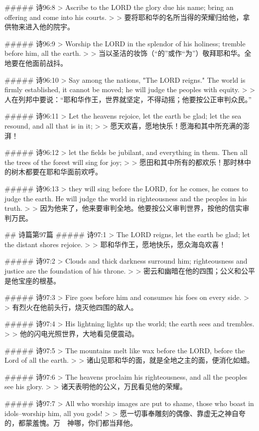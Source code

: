 ##### 诗96:8
> Ascribe to the LORD the glory due his name; bring an offering and come into his courts.
>
> 要将耶和华的名所当得的荣耀归给他，拿供物来进入他的院宇。


##### 诗96:9
> Worship the LORD in the splendor of his holiness; tremble before him, all the earth.
>
> 当以圣洁的妆饰（“的”或作“为”）敬拜耶和华。全地要在他面前战抖。


##### 诗96:10
> Say among the nations, "The LORD reigns." The world is firmly established, it cannot be moved; he will judge the peoples with equity.
>
> 人在列邦中要说：“耶和华作王，世界就坚定，不得动摇；他要按公正审判众民。”


##### 诗96:11
> Let the heavens rejoice, let the earth be glad; let the sea resound, and all that is in it;
>
> 愿天欢喜，愿地快乐！愿海和其中所充满的澎湃！


##### 诗96:12
> let the fields be jubilant, and everything in them. Then all the trees of the forest will sing for joy;
>
> 愿田和其中所有的都欢乐！那时林中的树木都要在耶和华面前欢呼。


##### 诗96:13
> they will sing before the LORD, for he comes, he comes to judge the earth. He will judge the world in righteousness and the peoples in his truth.
>
> 因为他来了，他来要审判全地。他要按公义审判世界，按他的信实审判万民。


## 诗篇第97篇
##### 诗97:1
> The LORD reigns, let the earth be glad; let the distant shores rejoice.
>
> 耶和华作王，愿地快乐，愿众海岛欢喜！


##### 诗97:2
> Clouds and thick darkness surround him; righteousness and justice are the foundation of his throne.
>
> 密云和幽暗在他的四围；公义和公平是他宝座的根基。


##### 诗97:3
> Fire goes before him and consumes his foes on every side.
>
> 有烈火在他前头行，烧灭他四围的敌人。


##### 诗97:4
> His lightning lights up the world; the earth sees and trembles.
>
> 他的闪电光照世界，大地看见便震动。


##### 诗97:5
> The mountains melt like wax before the LORD, before the Lord of all the earth.
>
> 诸山见耶和华的面，就是全地之主的面，便消化如蜡。


##### 诗97:6
> The heavens proclaim his righteousness, and all the peoples see his glory.
>
> 诸天表明他的公义，万民看见他的荣耀。


##### 诗97:7
> All who worship images are put to shame, those who boast in idols--worship him, all you gods!
>
> 愿一切事奉雕刻的偶像、靠虚无之神自夸的，都蒙羞愧。万　神哪，你们都当拜他。


